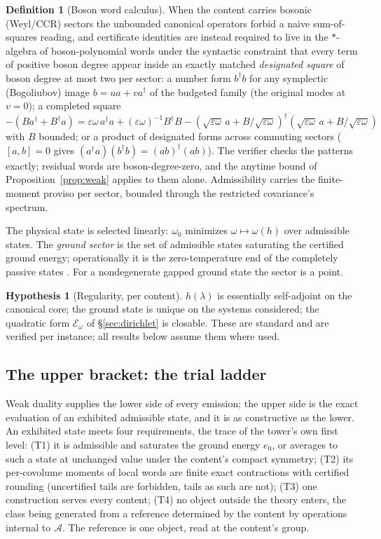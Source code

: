 \documentclass[11pt]{article}
\theoremstyle{definition}
\newtheorem{definition}[theorem]{Definition}
\newtheorem{hypothesis}[theorem]{Hypothesis}
\theoremstyle{remark}
\newcommand{\A}{\mathcal{A}}
\newcommand{\w}{\omega_0}
\newcommand{\E}{\mathcal{E}}
\begin{document}
\begin{definition}[Boson word calculus]\label{def:bosoncalc}
When the content carries bosonic (Weyl/CCR) sectors the unbounded canonical
operators forbid a naive sum-of-squares reading, and certificate identities
are instead required to live in the $*$-algebra of boson-polynomial words
under the syntactic constraint that every term of positive boson degree
appear inside an exactly matched \emph{designated square} of boson degree at
most two per sector: a number form $b^\dagger b$ for any symplectic
(Bogoliubov) image $b = ua + va^\dagger$ of the budgeted family (the
original modes at $v=0$); a completed square
\[
-(Ba^\dagger + B^\dagger a) = \varepsilon\omega\,a^\dagger a
+ (\varepsilon\omega)^{-1}B^\dagger B
- (\sqrt{\varepsilon\omega}\,a + B/\sqrt{\varepsilon\omega})^\dagger
(\sqrt{\varepsilon\omega}\,a + B/\sqrt{\varepsilon\omega})
\]
with $B$ bounded; or a product of designated forms across commuting sectors
($[a,b]=0$ gives $(a^\dagger a)(b^\dagger b) = (ab)^\dagger(ab)$).  The
verifier checks the patterns exactly; residual words are boson-degree-zero,
and the anytime bound of Proposition~\ref{prop:weak} applies to them alone.
Admissibility carries the finite-moment proviso per sector, bounded through
the restricted covariance's spectrum.
\end{definition}

The physical state is selected linearly: $\w$ minimizes
$\omega \mapsto \omega(h)$ over admissible states.  The \emph{ground
sector} is the set of admissible states saturating the certified ground
energy; operationally it is the zero-temperature end of the completely
passive states \cite{pusz}.  For a nondegenerate gapped ground state the
sector is a point.

\begin{hypothesis}[Regularity, per content]\label{hyp:reg}
$h(\lambda)$ is essentially self-adjoint on the canonical core; the
ground state is unique on the systems considered; the quadratic form
$\E_\omega$ of \S\ref{sec:dirichlet} is closable.  These are standard and
are verified per instance; all results below assume them where used.
\end{hypothesis}

\subsection{The upper bracket: the trial ladder}\label{sec:ladder}
Weak duality supplies the lower side of every emission; the upper side is
the exact evaluation of an exhibited admissible state, and it is as
constructive as the lower.  An exhibited state meets four requirements, the
trace of the tower's own first level: (T1) it is admissible and saturates
the ground energy $e_0$, or averages to such a state at unchanged value
under the content's compact symmetry; (T2) its per-covolume moments of
local words are finite exact contractions with certified rounding
(uncertified tails are forbidden, tails as such are not); (T3) one
construction serves every content; (T4) no object outside the theory
enters, the class being generated from a reference determined by the
content by operations internal to $\A$.  The reference is one object, read
at the content's group.
\end{document}
